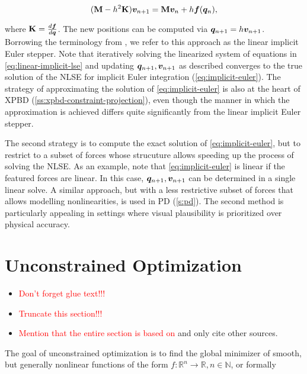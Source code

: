 \begin{equation}\label{eq:linear-implicit-stepper}
    (\mathbf{M} - h^2\mathbf{K})\bm{v}_{n+1} = \mathbf{M}\bm{v}_n + h\bm{f}(\bm{q}_n),
\end{equation}

\noindent where $\mathbf{K} = \frac{d\bm{f}}{d\bm{q}}$. The new positions can be computed via $\bm{q}_{n+1} = h \bm{v}_{n+1}$. 
Borrowing the terminology from \cite{servin2006}, we refer to this approach as the linear implicit Euler stepper. Note that iteratively solving
the linearized system of equations in \autoref{eq:linear-implicit-lse} and updating $\bm{q}_{n+1}, \bm{v}_{n+1}$ as described converges to 
the true solution of the NLSE for implicit Euler integration (\cref{eq:implicit-euler}). The strategy of approximating the solution of 
\autoref{eq:implicit-euler} is also at the heart of XPBD (\cref{ss:xpbd-constraint-projection}), even though the manner in which the 
approximation is achieved differs quite significantly from the linear implicit Euler stepper.

The second strategy is to compute the exact solution of \autoref{eq:implicit-euler}, but to restrict to a subset of forces whose strucuture 
allows speeding up the process of solving the NLSE. As an example, note that \autoref{eq:implicit-euler} is linear if the featured forces 
are linear. In this case, $\bm{q}_{n+1}, \bm{v}_{n+1}$ can be determined in a single linear solve. A similar approach, but with a less 
restrictive subset of forces that allows modelling nonlinearities, is used in PD (\cref{s:pd}). The second method is particularly appealing 
in settings where visual plausibility is prioritized over physical accuracy.

\section{Unconstrained Optimization}\label{s:unconstrained-optimization}
\begin{itemize}
    \item \textcolor{red}{Don't forget glue text!!!}
    \item \textcolor{red}{Truncate this section!!!}
    \item \textcolor{red}{Mention that the entire section is based on \cite{nocedal2006}} and only cite other sources.
\end{itemize}

The goal of unconstrained optimization is to find the global minimizer of smooth, but generally nonlinear functions of the form $f \colon 
\mathbb{R}^n \to \mathbb{R}, n \in \mathbb{N}$, or formally


